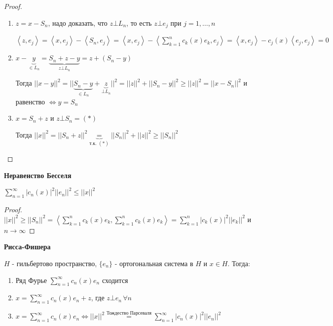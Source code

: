 \begin{proof}
    \begin{enumerate}
        \item {
            $z = x - S_n$, надо доказать, что $z \bot L_n$, то есть $z \bot e_j$ при $j = 1, \ldots, n$

            $\left < z, e_j \right > = \left < x, e_j \right > - \left < S_n, e_j \right > = \left < x, e_j \right > - \left < \sum_{k = 1}^n c_k (x) e_k, e_j \right > =
            \left < x, e_j \right > - c_j (x) \left < e_j, e_j \right > = 0$
        }
        \item {
            $x - \underbrace{y}_{\in L_n} = \underbrace{S_n + z - y}_{z \bot L_n} = z + (S_n - y)$

            Тогда $||x - y||^2 = || \underbrace{S_n - y}_{\in L_n} + \underbrace{z}_{\bot L_n} ||^2 = ||z||^2 + ||S_n - y||^2 \geqslant ||z||^2 = ||x - S_n||^2$ и равенство $\Longleftrightarrow y = S_n$
        }
        \item {
            $x = S_n + z$ и $z \bot S_n = (*)$

            Тогда $||x||^2 = || S_n + z ||^2 \underbrace{=}_{\text{т.к. } (*)} ||S_n||^2 + ||z||^2 \geqslant ||S_n||^2$
        }
    \end{enumerate}
\end{proof}

\begin{consequence}
    \textbf{Неравенство Бесселя}

    $\sum_{n = 1}^\infty |c_n (x)|^2 ||e_n||^2 \leqslant ||x||^2$
\end{consequence}

\begin{proof}
    $||x||^2 \geqslant ||S_n||^2 = \left < \sum_{k = 1}^n c_k (x)e_k, \sum_{k = 1}^n c_k (x)e_k \right > = \sum_{k  = 1}^n |c_k (x)|^2 ||e_k||^2$ и $n \to \infty$
\end{proof}

\begin{theorem}
    \textbf{Рисса-Фишера}

    $H$ - гильбертово пространство, $\{ e_n \}$ - ортогональная система в $H$ и $x \in H$. Тогда:

    \begin{enumerate}
        \item {
            Ряд Фурье $\sum_{n = 1}^\infty c_n (x) e_n$ сходится
        }
        \item {
            $x = \sum_{n = 1}^\infty c_n (x) e_n + z$, где $z \bot e_n \, \forall n$

        }
        \item {
            $x = \sum_{n = 1}^\infty c_n(x) e_n \Longleftrightarrow ||x||^2 \overset{\text{Тождество Парсеваля}}{=} \sum_{n = 1}^\infty |c_n (x)|^2 ||e_n||^2$
        }
    \end{enumerate}
\end{theorem}

